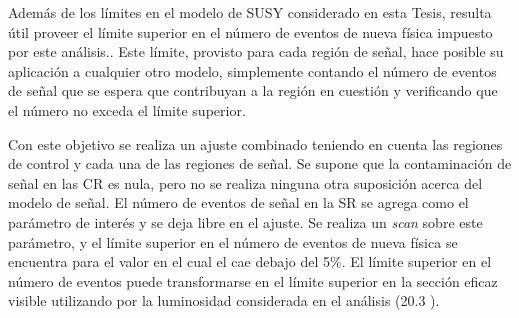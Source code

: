 Además de los límites en el modelo de SUSY considerado en esta Tesis, resulta
útil proveer el límite superior en el número de eventos de nueva física
impuesto por este análisis.. Este límite, provisto para cada región de señal, hace
posible su aplicación a cualquier otro modelo, simplemente contando el número de
eventos de señal que se espera que contribuyan a la región en cuestión y
verificando que el número no exceda el límite superior.

Con este objetivo se realiza un ajuste combinado teniendo en cuenta las regiones
de control y cada una de las regiones de señal. Se supone que la contaminación
de señal en las CR es nula, pero no se realiza ninguna otra suposición acerca
del modelo de señal. El número de eventos de señal en la SR se agrega como
el parámetro de interés y se deja libre en el ajuste. Se realiza un \emph{scan} sobre este parámetro,
y el límite superior en el número de eventos de nueva física se encuentra para el
valor en el cual el {\cls} cae debajo del 5\%. El límite superior en el número de
eventos puede transformarse en el límite superior en la sección eficaz visible utilizando
por la luminosidad considerada en el análisis (20.3 \ifb).



